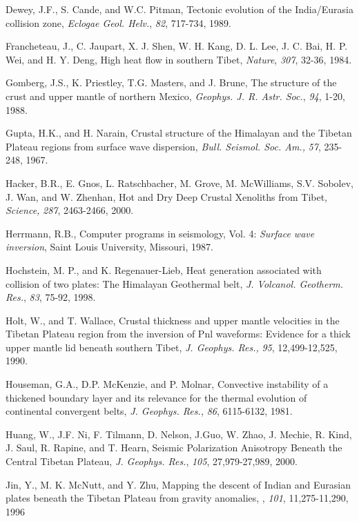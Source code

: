 \documentclass[12pt]{article}
\begin{document}
\begin{references}
Dewey, J.F., S. Cande, and W.C. Pitman, Tectonic evolution of the India/Eurasia
collision zone, {\it Eclogae Geol. Helv.}, {\it 82}, 717-734, 1989.

Francheteau, J., C. Jaupart, X. J. Shen, W. H. Kang, D. L. Lee,
J. C. Bai, H. P. Wei, and H. Y. Deng, High heat flow in southern
Tibet, {\it Nature}, {\it 307}, 32-36, 1984.

Gomberg, J.S., K. Priestley, T.G. Masters, and J. Brune, The structure of the crust 
and upper mantle of northern
Mexico, {\it Geophys. J. R. Astr. Soc.}, {\it 94}, 1-20, 1988.

Gupta, H.K., and H. Narain, Crustal structure of the Himalayan and
the Tibetan Plateau regions from surface wave dispersion, {\it Bull. Seismol.
Soc. Am.,} {\it 57}, 235-248, 1967.

Hacker, B.R., E. Gnos, L. Ratschbacher, M. Grove, M. McWilliams, S.V. Sobolev,
J. Wan, and W. Zhenhan, Hot and Dry Deep Crustal Xenoliths from Tibet,
{\it Science,} {\it 287}, 2463-2466, 2000.

Herrmann, R.B., Computer programs in seismology, Vol. 4: 
{\it Surface wave inversion}, Saint Louis University, Missouri, 1987.

Hochstein, M. P., and K. Regenauer-Lieb, Heat generation associated
with collision of two plates: The Himalayan Geothermal belt, {\it
J. Volcanol. Geotherm. Res.}, {\it 83}, 75-92, 1998.

Holt, W., and T. Wallace, Crustal thickness and upper mantle velocities
in the Tibetan Plateau region from the inversion of Pnl waveforms: Evidence
for a thick upper mantle lid beneath southern Tibet, {\it J. Geophys. Res.,} 
{\it 95}, 12,499-12,525, 1990.

Houseman, G.A., D.P. McKenzie, and P. Molnar, Convective instability
of a thickened boundary layer and its relevance for the thermal evolution of
continental convergent belts, {\it J. Geophys. Res.,} {\it 86}, 6115-6132, 1981.

Huang, W., J.F. Ni, F. Tilmann, D. Nelson, J.Guo, W. Zhao, J. Mechie,
R. Kind, J. Saul, R. Rapine, and T. Hearn, Seismic Polarization 
Anisotropy Beneath the Central Tibetan Plateau, {\it J. Geophys. Res.},
{\it 105}, 27,979-27,989, 2000.

Jin, Y., M. K. McNutt, and Y. Zhu, Mapping the descent of Indian and
Eurasian plates beneath the Tibetan Plateau from gravity anomalies,
\jgr, {\it 101}, 11,275-11,290, 1996


\end{references}
\end{document}
